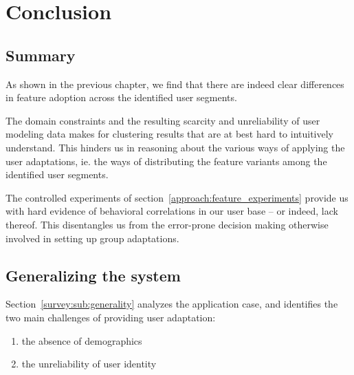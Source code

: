 \chapter{Conclusion}

\label{Chapter5}



\section{Summary} %
\label{conclusion:sec:summary}

As shown in the previous chapter, we find that there are indeed clear differences in feature adoption across the identified user segments.

The domain constraints and the resulting scarcity and unreliability of user modeling data makes for clustering results that are at best hard to intuitively understand. This hinders us in reasoning about the various ways of applying the user adaptations, ie. the ways of distributing the feature variants among the identified user segments.


The controlled experiments of section~\ref{approach:feature_experiments} provide us with hard evidence of behavioral correlations in our user base -- or indeed, lack thereof. This disentangles us from the error-prone decision making otherwise involved in setting up group adaptations.

\section{Generalizing the system} %
\label{conclusion:sec:generalizing_the_system}

Section~\ref{survey:sub:generality} analyzes the application case, and identifies the two main challenges of providing user adaptation:

\begin{enumerate}
  \item the absence of demographics
  \item the unreliability of user identity
\end{enumerate}

